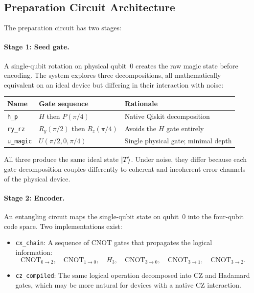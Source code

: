 \documentclass[11pt,a4paper]{article}
\newcommand{\code}[1]{\texttt{#1}}
\begin{document}
\subsection{Preparation Circuit Architecture}
\label{sec:prep}

The preparation circuit has two stages:

\paragraph{Stage 1: Seed gate.} A single-qubit rotation on physical qubit~0
creates the raw magic state before encoding. The system explores three
decompositions, all mathematically equivalent on an ideal device but differing
in their interaction with noise:

\begin{center}
\begin{tabular}{lll}
\toprule
\textbf{Name} & \textbf{Gate sequence} & \textbf{Rationale} \\
\midrule
\code{h\_p}    & $H$ then $P(\pi/4)$         & Native Qiskit decomposition \\
\code{ry\_rz}  & $R_y(\pi/2)$ then $R_z(\pi/4)$ & Avoids the $H$ gate entirely \\
\code{u\_magic} & $U(\pi/2, 0, \pi/4)$       & Single physical gate; minimal depth \\
\bottomrule
\end{tabular}
\end{center}

All three produce the same ideal state $\ket{T}$. Under noise, they differ
because each gate decomposition couples differently to coherent and incoherent
error channels of the physical device.

\paragraph{Stage 2: Encoder.} An entangling circuit maps the single-qubit
state on qubit~0 into the four-qubit code space. Two implementations exist:

\begin{itemize}
  \item \code{cx\_chain}: A sequence of CNOT gates that propagates the
    logical information:
    \[
      \text{CNOT}_{0 \to 2}, \quad
      \text{CNOT}_{1 \to 0}, \quad
      H_3, \quad
      \text{CNOT}_{3 \to 0}, \quad
      \text{CNOT}_{3 \to 1}, \quad
      \text{CNOT}_{3 \to 2}.
    \]
  \item \code{cz\_compiled}: The same logical operation decomposed into CZ and
    Hadamard gates, which may be more natural for devices with a native CZ
    interaction.
\end{itemize}
\end{document}
